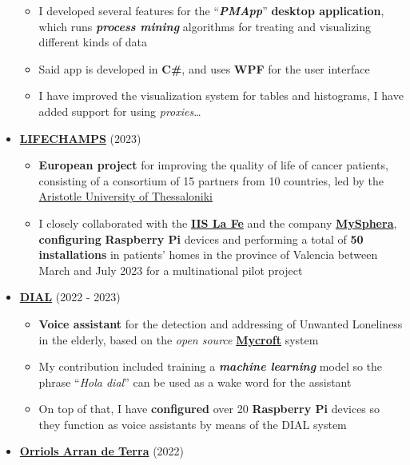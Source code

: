 \documentclass[letterpaper, 12pt, dvipsnames]{article}
\begin{document}
\begin{itemize}
\begin{itemize}
              \item I developed several features for the ``\textbf{\emph{PMApp}}'' \textbf{desktop application}, which runs \textbf{\emph{process mining}} algorithms for treating and visualizing different kinds of data
              \item Said app is developed in \textbf{C\#}, and uses \textbf{WPF} for the user interface
              \item I have improved the visualization system for tables and histograms, I have added support for using \emph{proxies}\dots
          \end{itemize}
    \item {\large\textbf{\href{https://lifechamps.eu/}{LIFECHAMPS}}} (2023)
          \begin{itemize}
            \item \textbf{European project} for improving the quality of life of cancer patients, consisting of a consortium of 15 partners from 10 countries, led by the \href{https://www.auth.gr/en/}{Aristotle University of Thessaloniki}
            \item I closely collaborated with the \textbf{\href{https://www.iislafe.es/es/}{IIS La Fe}} and the company \textbf{\href{https://www.mysphera.com/es/}{MySphera}}, \textbf{configuring} \textbf{Raspberry Pi} devices and performing a total of \textbf{50 installations} in patients' homes in the province of Valencia between March and July 2023 for a multinational pilot project
          \end{itemize}
    \item {\large\textbf{\href{http://www.sabien.upv.es/project/dial/}{DIAL}}} (2022 - 2023)
          \begin{itemize}
              \item \textbf{Voice assistant} for the detection and addressing of Unwanted Loneliness in the elderly, based on the \emph{open source} \textbf{\href{https://mycroft.ai/}{Mycroft}} system
              \item My contribution included training a \textbf{\emph{machine learning}} model so the phrase ``\emph{Hola dial}'' can be used as a wake word for the assistant
              \item On top of that, I have \textbf{configured} over 20 \textbf{Raspberry Pi} devices so they function as voice assistants by means of the DIAL system
          \end{itemize}
    \item {\large\textbf{\href{https://orriolsarrandeterra.com/}{Orriols Arran de Terra}}} (2022)

\end{itemize}
\end{document}
